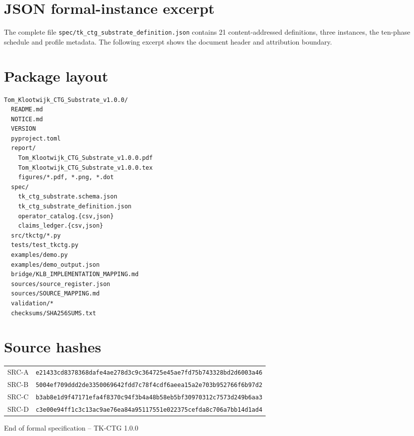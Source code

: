 \documentclass[10pt,a4paper]{article}
\newcommand{\code}[1]{\texttt{#1}}
\begin{document}
\section{JSON formal-instance excerpt}
\label{app:json}

The complete file \code{spec/tk\_ctg\_substrate\_definition.json} contains 21 content-addressed definitions, three instances, the ten-phase schedule and profile metadata. The following excerpt shows the document header and attribution boundary.



\section{Package layout}
\label{app:layout}

\begin{lstlisting}
Tom_Klootwijk_CTG_Substrate_v1.0.0/
  README.md
  NOTICE.md
  VERSION
  pyproject.toml
  report/
    Tom_Klootwijk_CTG_Substrate_v1.0.0.pdf
    Tom_Klootwijk_CTG_Substrate_v1.0.0.tex
    figures/*.pdf, *.png, *.dot
  spec/
    tk_ctg_substrate.schema.json
    tk_ctg_substrate_definition.json
    operator_catalog.{csv,json}
    claims_ledger.{csv,json}
  src/tkctg/*.py
  tests/test_tkctg.py
  examples/demo.py
  examples/demo_output.json
  bridge/KLB_IMPLEMENTATION_MAPPING.md
  sources/source_register.json
  sources/SOURCE_MAPPING.md
  validation/*
  checksums/SHA256SUMS.txt
\end{lstlisting}

\section{Source hashes}
\label{app:hashes}

\begin{tabularx}{\textwidth}{@{}L{14mm}Y@{}}
\toprule
SRC-A & \texttt{e21433cd8378368dafe4ae278d3c9c364725e45ae7fd75b743328bd2d6003a46} \\
SRC-B & \texttt{5004ef709ddd2de3350069642fdd7c78f4cdf6aeea15a2e703b952766f6b97d2} \\
SRC-C & \texttt{b3ab8e1d9f47171efa4f8370c94f3b4a48b58eb5bf30970312c7573d249b6aa3} \\
SRC-D & \texttt{c3e00e94ff1c3c13ac9ae76ea84a95117551e022375cefda8c706a7bb14d1ad4} \\
\bottomrule
\end{tabularx}

\vfill
\begin{center}
\sffamily\small End of formal specification -- TK-CTG 1.0.0
\end{center}
\end{document}
